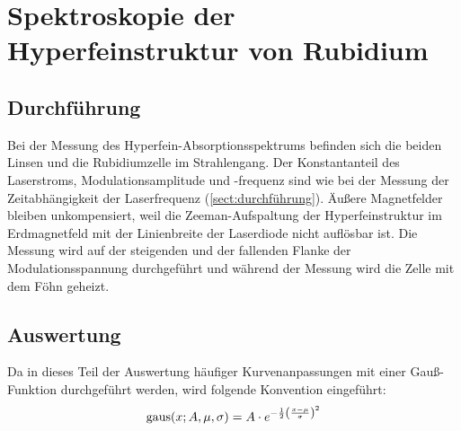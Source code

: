 \section{Spektroskopie der Hyperfeinstruktur von Rubidium}
\subsection{Durchführung}
Bei der Messung des Hyperfein-Absorptionsspektrums befinden sich die beiden Linsen und
die Rubidiumzelle im Strahlengang.
Der Konstantanteil des Laserstroms, Modulationsamplitude und -frequenz
sind wie bei der Messung der Zeitabhängigkeit der Laserfrequenz (\autoref{sect:durchführung}).
Äußere Magnetfelder bleiben unkompensiert, weil die Zeeman-Aufspaltung der Hyperfeinstruktur im Erdmagnetfeld
mit der Linienbreite der Laserdiode nicht auflösbar ist.
Die Messung wird auf der steigenden und der fallenden Flanke der Modulationsspannung durchgeführt und
während der Messung wird die Zelle mit dem Föhn geheizt.


\subsection{Auswertung}
Da in dieses Teil der Auswertung häufiger Kurvenanpassungen mit einer Gauß-Funktion durchgeführt werden, wird folgende Konvention eingeführt:
\begin{equation}
    \label{eq:convention:gauss}
    \operatorname{gaus}(x; A, \mu, \sigma) = A \cdot e^{-\frac{1}{2} \left( \frac{x-\mu}{\sigma} \right)^2}
\end{equation}

